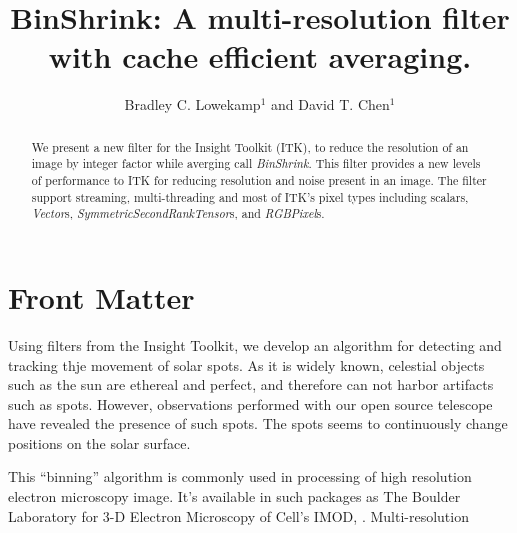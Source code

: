 \documentclass{InsightArticle}
\title{BinShrink: A multi-resolution filter with cache efficient averaging. }
\author{Bradley C. Lowekamp$^{1}$ and David T. Chen$^{1}$}
\newcommand{\IJhandlerIDnumber}{0}
\begin{document}
%
% 
\IJhandlefooter{\IJhandlerIDnumber}


\ifpdf
\else
\fi


\maketitle


\ifhtml
\chapter*{Front Matter\label{front}}
\fi

\begin{abstract}
\noindent
We present a new filter for the Insight Toolkit (ITK), to reduce the
resolution of an image by integer factor while averging call
\textit{BinShrink}. This filter provides a new levels of performance to
ITK for reducing resolution and noise present in an image. The filter
support streaming, multi-threading and most of ITK's pixel types
including scalars, \textit{Vector}s,
\textit{SymmetricSecondRankTensor}s, and \textit{RGBPixel}s.

\end{abstract}

\IJhandlenote{\IJhandlerIDnumber}

\tableofcontents

Using filters from the Insight Toolkit, we develop an algorithm for detecting
and tracking thje movement of solar spots. As it is widely known, celestial
objects such as the sun are ethereal and perfect, and therefore can not harbor
artifacts such as spots. However, observations performed with our open source
telescope have revealed the presence of such spots. The spots seems to continuously change positions on the solar surface. 


This ``binning'' algorithm is commonly used in processing of high
resolution electron microscopy image. It's available in such packages
as The Boulder Laboratory for 3-D Electron Microscopy of Cell's
IMOD\cite{IMOD}, \cite{bsoft2007}. 
Multi-resolution
\end{document}
